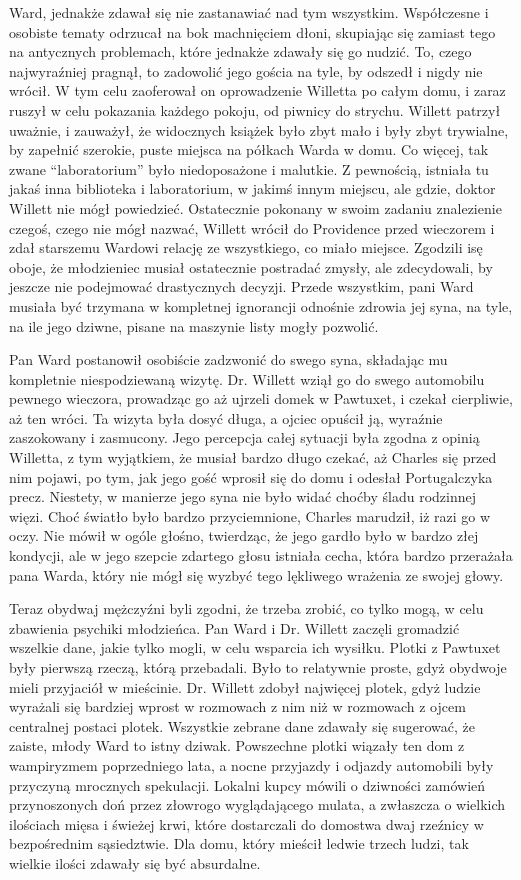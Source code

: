 Ward, jednakże zdawał się nie zastanawiać nad tym wszystkim. Współczesne i osobiste tematy odrzucał na bok machnięciem dłoni, skupiając się zamiast tego na antycznych problemach, które jednakże zdawały się go nudzić. To, czego najwyraźniej pragnął, to zadowolić jego gościa na tyle, by odszedł i nigdy nie wrócił. W tym celu zaoferował on oprowadzenie Willetta po całym domu, i zaraz ruszył w celu pokazania każdego pokoju, od piwnicy do strychu. Willett patrzył uważnie, i zauważył, że widocznych książek było zbyt mało i były zbyt trywialne, by zapełnić szerokie, puste miejsca na półkach Warda w domu. Co więcej, tak zwane ``laboratorium'' było niedoposażone i malutkie. Z pewnością, istniała tu jakaś inna biblioteka i laboratorium, w jakimś innym miejscu, ale gdzie, doktor Willett nie mógł powiedzieć. Ostatecznie pokonany w swoim zadaniu znalezienie czegoś, czego nie mógł nazwać, Willett wrócił do Providence przed wieczorem i zdał starszemu Wardowi relację ze wszystkiego, co miało miejsce. Zgodzili isę oboje, że młodzieniec musiał ostatecznie postradać zmysły, ale zdecydowali, by jeszcze nie podejmować drastycznych decyzji. Przede wszystkim, pani Ward musiała być trzymana w kompletnej ignorancji odnośnie zdrowia jej syna, na tyle, na ile jego dziwne, pisane na maszynie listy mogły pozwolić. 

Pan Ward postanowił osobiście zadzwonić do swego syna, składając mu kompletnie niespodziewaną wizytę. Dr. Willett wziął go do swego automobilu pewnego wieczora, prowadząc go aż ujrzeli domek w Pawtuxet, i czekał cierpliwie, aż ten wróci. Ta wizyta była dosyć długa, a ojciec opuścił ją, wyraźnie zaszokowany i zasmucony. Jego percepcja całej sytuacji była zgodna z opinią Willetta, z tym wyjątkiem, że musiał bardzo długo czekać, aż Charles się przed nim pojawi, po tym, jak jego gość wprosił się do domu i odesłał Portugalczyka precz. Niestety, w manierze jego syna nie było widać choćby śladu rodzinnej więzi. Choć światło było bardzo przyciemnione, Charles marudził, iż razi go w oczy. Nie mówił w ogóle głośno, twierdząc, że jego gardło było w bardzo złej kondycji, ale w jego szepcie zdartego głosu istniała cecha, która bardzo przerażała pana Warda, który nie mógł się wyzbyć tego lękliwego wrażenia ze swojej głowy.

Teraz obydwaj mężczyźni byli zgodni, że trzeba zrobić, co tylko mogą, w celu zbawienia psychiki młodzieńca. Pan Ward i Dr. Willett zaczęli gromadzić wszelkie dane, jakie tylko mogli, w celu wsparcia ich wysiłku. Plotki z Pawtuxet były pierwszą rzeczą, którą przebadali. Było to relatywnie proste, gdyż obydwoje mieli przyjaciół w mieścinie. Dr. Willett zdobył najwięcej plotek, gdyż ludzie wyrażali się bardziej wprost w rozmowach z nim niż w rozmowach z ojcem centralnej postaci plotek. Wszystkie zebrane dane zdawały się sugerować, że zaiste, młody Ward to istny dziwak. Powszechne plotki wiązały ten dom z wampiryzmem poprzedniego lata, a nocne przyjazdy i odjazdy automobili były przyczyną mrocznych spekulacji. Lokalni kupcy mówili o dziwności zamówień przynoszonych doń przez złowrogo wyglądającego mulata, a zwłaszcza o wielkich ilościach mięsa i świeżej krwi, które dostarczali do domostwa dwaj rzeźnicy w bezpośrednim sąsiedztwie. Dla domu, który mieścił ledwie trzech ludzi, tak wielkie ilości zdawały się być absurdalne.  


